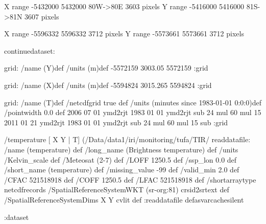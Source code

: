 X range -5432000 5432000  80W->80E 3603 pixels
Y range -5416000 5416000  81S->81N 3607 pixels

X range -5596332 5596332  3712 pixels
Y range -5573661 5573661  3712 pixels

\begin{ingrid}
continuedataset:

grid:
/name (Y)def
/units (m)def
-5572159 3003.05 5572159
:grid

grid:
/name (X)def
/units (m)def
-5594824 3015.265 5594824
:grid

grid:
/name (T)def
/netcdfgrid true def
/units (minutes since 1983-01-01 0:0:0)def
/pointwidth 0.0 def
2006 07 01 ymd2rjt 1983 01 01 ymd2rjt sub 24 mul 60 mul
15
2011 01 21 ymd2rjt 1983 01 01 ymd2rjt sub 24 mul 60 mul 15 sub
:grid

/temperature{
[ X Y | T] (/Data/data1/iri/monitoring/tufa/TIR/%
readdatafile:
/name (temperature) def
/long_name (Brightness temperature) def
/units /Kelvin_scale def
/Meteosat (2-7) def
/LOFF 1250.5 def
/ssp_lon 0.0 def
/short_name (temperature) def
/missing_value -99 def
/valid_min 2.0 def
/CFAC 521518918 def
/COFF 1250.5 def
/LFAC 521518918 def
/shortarraytype netcdfrecords
/SpatialReferenceSystemWKT (sr-org:81) crsid2srtext def
/SpatialReferenceSystemDims { X Y } cvlit  def
:readdatafile
}defasvarcachesilent

:dataset

\end{ingrid}
